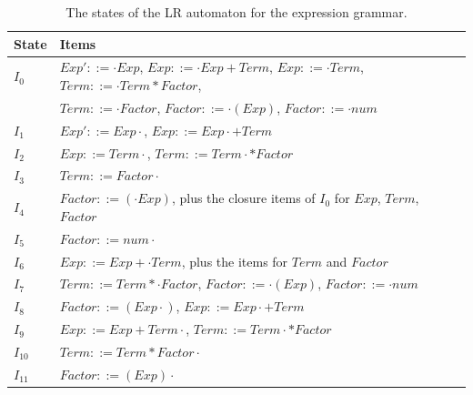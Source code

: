 \begin{table}[h]
\centering
\small
\begin{tabular}{l l}
  \toprule
  State & Items \\
  \midrule
  $I_0$    & $\mathit{Exp'} ::= \cdot\mathit{Exp}$, $\mathit{Exp} ::= \cdot\mathit{Exp}+\mathit{Term}$, $\mathit{Exp} ::= \cdot\mathit{Term}$, $\mathit{Term} ::= \cdot\mathit{Term}*\mathit{Factor}$, \\
           & $\mathit{Term} ::= \cdot\mathit{Factor}$, $\mathit{Factor} ::= \cdot(\mathit{Exp})$, $\mathit{Factor} ::= \cdot\mathit{num}$ \\
  $I_1$    & $\mathit{Exp'} ::= \mathit{Exp}\cdot$, $\mathit{Exp} ::= \mathit{Exp}\cdot+\mathit{Term}$ \\
  $I_2$    & $\mathit{Exp} ::= \mathit{Term}\cdot$, $\mathit{Term} ::= \mathit{Term}\cdot*\mathit{Factor}$ \\
  $I_3$    & $\mathit{Term} ::= \mathit{Factor}\cdot$ \\
  $I_4$    & $\mathit{Factor} ::= (\cdot\mathit{Exp})$, plus the closure items of $I_0$ for $\mathit{Exp}$, $\mathit{Term}$, $\mathit{Factor}$ \\
  $I_5$    & $\mathit{Factor} ::= \mathit{num}\cdot$ \\
  $I_6$    & $\mathit{Exp} ::= \mathit{Exp}+\cdot\mathit{Term}$, plus the items for $\mathit{Term}$ and $\mathit{Factor}$ \\
  $I_7$    & $\mathit{Term} ::= \mathit{Term}*\cdot\mathit{Factor}$, $\mathit{Factor} ::= \cdot(\mathit{Exp})$, $\mathit{Factor} ::= \cdot\mathit{num}$ \\
  $I_8$    & $\mathit{Factor} ::= (\mathit{Exp}\cdot)$, $\mathit{Exp} ::= \mathit{Exp}\cdot+\mathit{Term}$ \\
  $I_9$    & $\mathit{Exp} ::= \mathit{Exp}+\mathit{Term}\cdot$, $\mathit{Term} ::= \mathit{Term}\cdot*\mathit{Factor}$ \\
  $I_{10}$ & $\mathit{Term} ::= \mathit{Term}*\mathit{Factor}\cdot$ \\
  $I_{11}$ & $\mathit{Factor} ::= (\mathit{Exp})\cdot$ \\
  \bottomrule
\end{tabular}
\caption{The states of the LR automaton for the expression grammar.}
\label{tab:lr-items}
\end{table}

